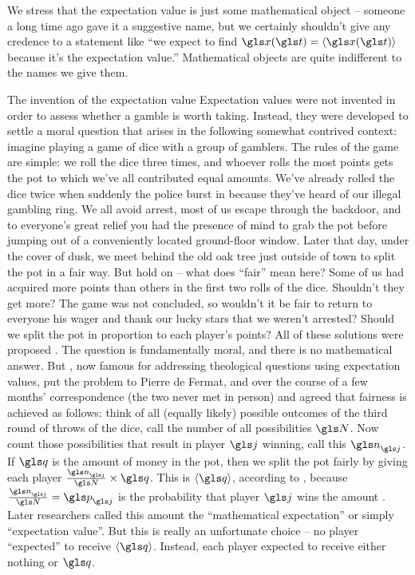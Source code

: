 We stress that the expectation value is just some mathematical
object -- someone a long time ago gave it a suggestive 
name, but we certainly shouldn't 
give any credence to a statement like ``we expect to find $\x(\t)=\ave{\x(\t)}$ 
because it's the expectation value.'' Mathematical objects
are quite indifferent to the names we give them.


\begin{history}{The invention of the expectation value}
Expectation values 
were not invented in order to assess whether a gamble is 
worth taking. Instead, they were developed to settle a  
moral question that arises in the following somewhat contrived 
context: imagine playing a game of dice with a 
group of gamblers. The rules of the game are simple: we 
roll the dice three times,  and whoever rolls the most points 
gets the pot to which we've all contributed equal amounts. 
We've already rolled the dice twice when suddenly the 
police burst in because they've heard of our illegal gambling ring. 
We all avoid arrest, most of us escape through the backdoor, 
and to everyone's great relief you had the presence of mind 
to grab the pot before jumping out of a conveniently located 
ground-floor window. Later that day, under the cover of dusk, 
we meet behind the old oak tree just outside of town to split 
the pot in a fair way. But hold on -- what does ``fair'' mean here?
Some of us had acquired more points than others in the first 
two rolls of the dice. Shouldn't they get more? The game was 
not concluded, so wouldn't it be fair to return to everyone his 
wager and thank our lucky stars that we weren't arrested? 
Should we split the pot in proportion to each player's points? 
All of these solutions were proposed \cite{Devlin2008}.
The question is fundamentally moral, and there is no 
mathematical answer. But , now famous for 
addressing theological questions using expectation values, put the 
problem to Pierre de Fermat, and over the course of a few months' 
correspondence (the two never met in person)  and 
 agreed that fairness is achieved as follows: 
think of all (equally likely) possible outcomes of the third round 
of throws of the dice, call the number of all possibilities $\N$. 
Now count those possibilities that result in player $\gj$ winning, 
call this $\gn_\gj$. If $\q$ is the amount of money in the pot, then 
we split the pot fairly by giving each player
 $\frac{\gn_\gj}{\N}\times \q$.
This is $\ave{\q}$, according to , 
because $\frac{\gn_\gj}{\N}=\p_\gj$ is the probability that player $\gj$ wins the
amount \q. 
Later researchers called this amount the ``mathematical expectation''  
or simply ``expectation value''. But this is really an unfortunate choice 
 -- no player ``expected'' to receive $\ave{\q}$. 
Instead, each player expected to receive either nothing or $\q$. 
\end{history}

